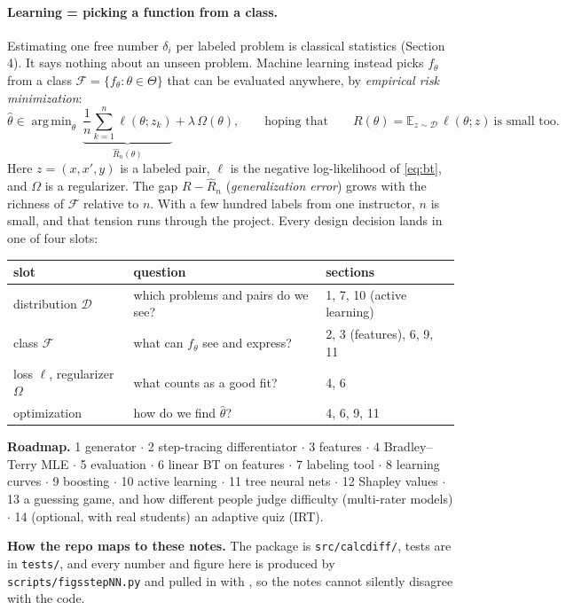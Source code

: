 \documentclass[11pt]{article}
\theoremstyle{definition}
\theoremstyle{plain}
\theoremstyle{remark}
\newcommand{\E}{\mathbb{E}}
\renewcommand{\_}{\oldunderscore\allowbreak}
\newcommand{\file}[1]{\textcolor{blue!50!black}{\texttt{#1}}}
\DeclareMathOperator*{\argmin}{arg\,min}
\begin{document}
\paragraph{Learning = picking a function from a class.}
Estimating one free number $\delta_i$ per labeled problem is classical statistics
(Section 4). It says nothing about an unseen problem. Machine learning instead picks
$f_\theta$ from a class $\mathcal F=\{f_\theta:\theta\in\Theta\}$ that can be evaluated anywhere,
by \emph{empirical risk minimization}:
\[
  \hat\theta\in\argmin_{\theta}\ \underbrace{\frac1n\sum_{k=1}^n\ell(\theta;z_k)}_{\widehat R_n(\theta)}+\lambda\,\Omega(\theta),
  \qquad\text{hoping that}\qquad R(\theta)=\E_{z\sim\mathcal D}\,\ell(\theta;z)\ \text{is small too}.
\]
Here $z=(x,x',y)$ is a labeled pair, $\ell$ is the negative log-likelihood of \eqref{eq:bt},
and $\Omega$ is a regularizer. The gap $R-\widehat R_n$ (\emph{generalization error})
grows with the richness of $\mathcal F$ relative to $n$. With a few hundred labels from one
instructor, $n$ is small, and that tension runs through the project. Every design
decision lands in one of four slots:

\begin{center}\small
\begin{tabular}{@{}lll@{}}
\toprule
slot & question & sections\\\midrule
distribution $\mathcal D$ & which problems and pairs do we see? & 1, 7, 10 (active learning)\\
class $\mathcal F$ & what can $f_\theta$ see and express? & 2, 3 (features), 6, 9, 11\\
loss $\ell$, regularizer $\Omega$ & what counts as a good fit? & 4, 6\\
optimization & how do we find $\hat\theta$? & 4, 6, 9, 11\\\bottomrule
\end{tabular}
\end{center}

\noindent\textbf{Roadmap.} 1 generator $\cdot$ 2 step-tracing differentiator $\cdot$ 3 features $\cdot$
4 Bradley--Terry MLE $\cdot$ 5 evaluation $\cdot$ 6 linear BT on features $\cdot$ 7 labeling tool
$\cdot$ 8 learning curves $\cdot$ 9 boosting $\cdot$ 10 active learning $\cdot$ 11 tree neural nets
$\cdot$ 12 Shapley values $\cdot$ 13 a guessing game, and how different people judge difficulty
(multi-rater models) $\cdot$ 14 (optional, with real students) an adaptive quiz (IRT).

\medskip\noindent\textbf{How the repo maps to these notes.} The package is \file{src/calcdiff/}, tests are in
\file{tests/}, and every number and figure here is produced by \file{scripts/figs\_stepNN.py} and pulled
in with \verb||, so the notes cannot silently disagree with the code.
\end{document}
